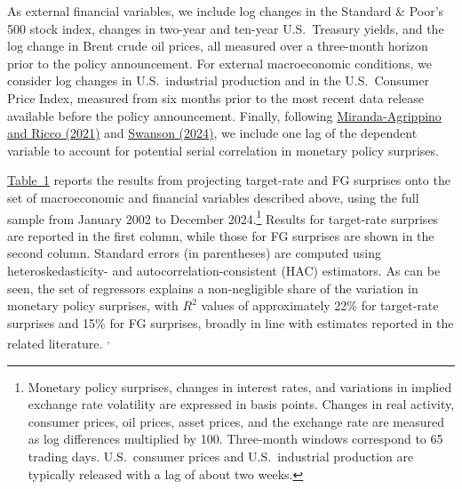 \documentclass[12pt, reqno]{article}
\begin{document}
As external financial variables, we include log changes in the Standard \& Poor’s 500 stock index, changes in two-year and ten-year U.S.\ Treasury yields, and the log change in Brent crude oil prices, all measured over a three-month horizon prior to the policy announcement. For external macroeconomic conditions, we consider log changes in U.S.\ industrial production and in the U.S.\ Consumer Price Index, measured from six months prior to the most recent data release available before the policy announcement. Finally, following \hyperlink{Miranda-Agrippino and Ricco (2021)}{Miranda-Agrippino and Ricco (2021)} and \hyperlink{Swanson (2024)}{Swanson (2024)}, we include one lag of the dependent variable to account for potential serial correlation in monetary policy surprises.


\hyperlink{Table 1}{Table~1} reports the results from projecting target-rate and FG surprises onto the set of macroeconomic and financial variables described above, using the full sample from January 2002 to December 2024.\footnote{Monetary policy surprises, changes in interest rates, and variations in implied exchange rate volatility are expressed in basis points. Changes in real activity, consumer prices, oil prices, asset prices, and the exchange rate are measured as log differences multiplied by 100. Three-month windows correspond to 65 trading days. U.S.\ consumer prices and U.S.\ industrial production are typically released with a lag of about two weeks.} Results for target-rate surprises are reported in the first column, while those for FG surprises are shown in the second column. Standard errors (in parentheses) are computed using heteroskedasticity- and autocorrelation-consistent (HAC) estimators. As can be seen, the set of regressors explains a non-negligible share of the variation in monetary policy surprises, with $R^2$ values of approximately 22\% for target-rate surprises and 15\% for FG surprises, broadly in line with estimates reported in the related literature.\footnotemark
{}\textsuperscript{,}\footnotemark
\end{document}
